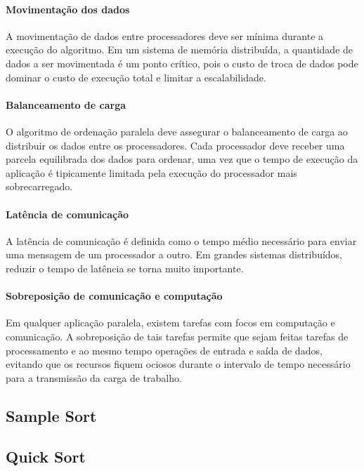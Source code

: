 \paragraph*{Movimentação dos dados}
A movimentação de dados entre processadores deve ser mínima durante a execução do algoritmo. Em um sistema de memória distribuída, a quantidade de dados a ser movimentada é um ponto crítico, pois o custo de troca de dados pode dominar o custo de execução total e limitar a escalabilidade.


\paragraph*{Balanceamento de carga} 
O algoritmo de ordenação paralela deve assegurar o balanceamento de carga ao distribuir os dados entre os processadores. Cada processador deve receber uma parcela equilibrada dos dados para ordenar, uma vez que o tempo de execução da aplicação é tipicamente limitada pela execução do processador mais sobrecarregado. 

\paragraph*{Latência de comunicação}
A latência de comunicação é definida como o tempo médio necessário para enviar uma mensagem de um processador a outro. 
Em grandes sistemas distribuídos, reduzir o tempo de latência se torna muito importante. 

\paragraph*{Sobreposição de comunicação e computação}
Em qualquer aplicação paralela, existem tarefas com focos em computação e comunicação. A sobreposição de tais tarefas permite que sejam feitas tarefas de processamento e ao mesmo tempo operações de entrada e saída de dados, evitando que os recursos fiquem ociosos durante o intervalo de tempo necessário para a transmissão da carga de trabalho. 

\subsection{Sample Sort}
\subsection{Quick Sort}

